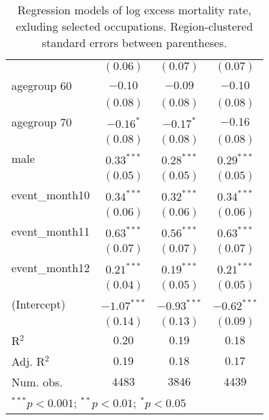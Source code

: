 \begin{table}
\begin{center}
\begin{tabular}{l c c c}
                     & $(0.06)$      & $(0.07)$      & $(0.07)$      \\
agegroup 60          & $-0.10$       & $-0.09$       & $-0.10$       \\
                     & $(0.08)$      & $(0.08)$      & $(0.08)$      \\
agegroup 70          & $-0.16^{*}$   & $-0.17^{*}$   & $-0.16$       \\
                     & $(0.08)$      & $(0.08)$      & $(0.08)$      \\
male                 & $0.33^{***}$  & $0.28^{***}$  & $0.29^{***}$  \\
                     & $(0.05)$      & $(0.05)$      & $(0.05)$      \\
event\_month10       & $0.34^{***}$  & $0.32^{***}$  & $0.34^{***}$  \\
                     & $(0.06)$      & $(0.06)$      & $(0.06)$      \\
event\_month11       & $0.63^{***}$  & $0.56^{***}$  & $0.63^{***}$  \\
                     & $(0.07)$      & $(0.07)$      & $(0.07)$      \\
event\_month12       & $0.21^{***}$  & $0.19^{***}$  & $0.21^{***}$  \\
                     & $(0.04)$      & $(0.05)$      & $(0.05)$      \\
(Intercept)          & $-1.07^{***}$ & $-0.93^{***}$ & $-0.62^{***}$ \\
                     & $(0.14)$      & $(0.13)$      & $(0.09)$      \\
\hline
R$^2$                & $0.20$        & $0.19$        & $0.18$        \\
Adj. R$^2$           & $0.19$        & $0.18$        & $0.17$        \\
Num. obs.            & $4483$        & $3846$        & $4439$        \\
\hline
\multicolumn{4}{l}{\scriptsize{$^{***}p<0.001$; $^{**}p<0.01$; $^{*}p<0.05$}}
\end{tabular}
\caption{Regression models of log excess mortality rate, exluding selected occupations. Region-clustered standard errors between parentheses.}
\label{tab:altoccmodels}
\end{center}
\end{table}
